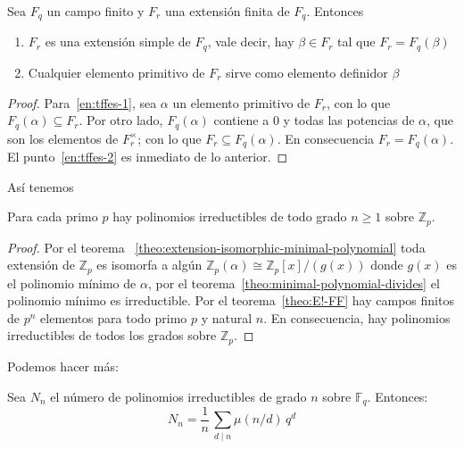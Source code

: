   \begin{theorem}
    \label{theo:finite-field-extension=simple-extension}
    Sea \(F_q\) un campo finito
    y \(F_r\) una extensión finita de \(F_q\).
    Entonces
    \begin{enumerate}[label = (\roman*), ref = (\roman*)]
    \item
      \label{en:tffes-1}
      \(F_r\) es una extensión simple de \(F_q\),
      vale decir,
      hay \(\beta \in F_r\) tal que \(F_r = F_q(\beta)\)
    \item
      \label{en:tffes-2}
      Cualquier elemento primitivo de \(F_r\)
      sirve como elemento definidor \(\beta\)
    \end{enumerate}
  \end{theorem}
  \begin{proof}
    Para~\ref{en:tffes-1},
    sea \(\alpha\) un elemento primitivo de \(F_r\),
    con lo que \(F_q(\alpha) \subseteq F_r\).
    Por otro lado,
    \(F_q(\alpha)\) contiene a \(0\)
    y todas las potencias de \(\alpha\),
    que son los elementos de \(F_r^\times\);
    con lo que \(F_r \subseteq F_q(\alpha)\).
    En consecuencia \(F_r = F_q(\alpha)\).
    El punto~\ref{en:tffes-2} es inmediato de lo anterior.
  \end{proof}
  Así tenemos
  \begin{corollary}
    \label{cor:E-irreducible-degrees}
    Para cada primo \(p\)
    hay polinomios irreductibles
    de todo grado \(n \ge 1\) sobre \(\mathbb{Z}_p\).
  \end{corollary}
  \begin{proof}
    Por el teorema~%
      \ref{theo:extension-isomorphic-minimal-polynomial}
    toda extensión de \(\mathbb{Z}_p\) es isomorfa
    a algún \(\mathbb{Z}_p(\alpha) \cong \mathbb{Z}_p[x] / (g(x))\)
    donde \(g(x)\) es el polinomio mínimo de \(\alpha\),
    por el teorema~\ref{theo:minimal-polynomial-divides}
    el polinomio mínimo es irreductible.
    Por el teorema~\ref{theo:E!-FF}
    hay campos finitos de \(p^n\) elementos
    para todo primo \(p\) y natural \(n\).
    En consecuencia,
    hay polinomios irreductibles
    de todos los grados sobre \(\mathbb{Z}_p\).
  \end{proof}
  Podemos hacer más:
  \begin{theorem}
    \label{theo:number-irreducible-polynomials}
    Sea \(N_n\) el número de polinomios irreductibles de grado \(n\)
    sobre\/ \(\mathbb{F}_q\).
    Entonces:
    \begin{equation}
      \label{eq:N-irreducible-polynomials-degree-n}
      N_n
	= \frac{1}{n} \, \sum_{d \mid n} \mu(n / d)  \, q^d
    \end{equation}
  \end{theorem}
